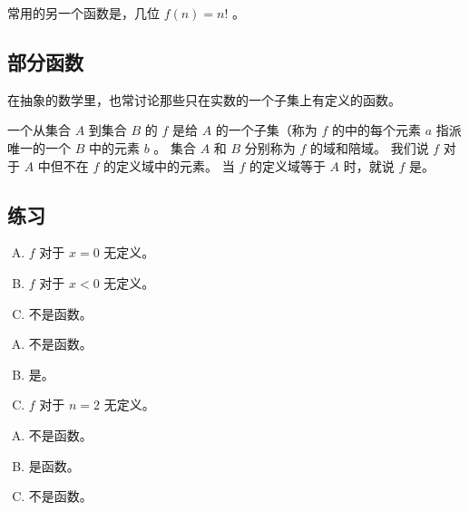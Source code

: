 {{        常用的另一个函数是，几位 $f(n) = n!$ 。
    }

    \subsection{部分函数}
    {
        在抽象的数学里，也常讨论那些只在实数的一个子集上有定义的函数。

        \begin{defines}
            一个从集合 $A$ 到集合 $B$ 的 $f$ 是给 $A$ 的一个子集（称为 $f$ 的中的每个元素 $a$ 指派唯一的一个 $B$ 中的元素 $b$ 。
            集合 $A$ 和 $B$ 分别称为 $f$ 的域和陪域。
            我们说 $f$ 对于 $A$ 中但不在 $f$ 的定义域中的元素。
            当 $f$ 的定义域等于 $A$ 时，就说 $f$ 是。
        \end{defines}
    }

    \subsection{练习}
    {
        \begin{practices}
            \begin{enumerate}[A.]
                \item $f$ 对于 $x = 0$ 无定义。
                \item $f$ 对于 $x < 0$ 无定义。
                \item 不是函数。
            \end{enumerate}
        \end{practices}

        \begin{practices}
            \begin{enumerate}[A.]
                \item 不是函数。
                \item 是。
                \item $f$ 对于 $n = 2$ 无定义。
            \end{enumerate}
        \end{practices}

        \begin{practices}
            \begin{enumerate}[A.]
                \item 不是函数。
                \item 是函数。
                \item 不是函数。
            \end{enumerate}
        \end{practices}

}}
